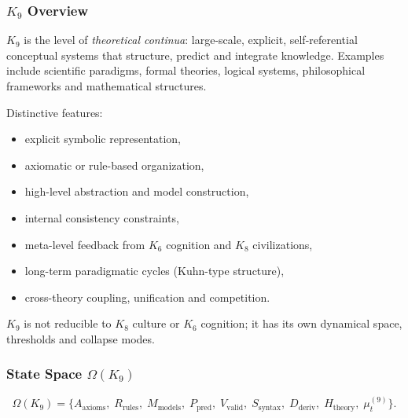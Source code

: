

\subsubsection{\texorpdfstring{$K_9$}{K_9} Overview}
\label{sec:k9-overview}

$K_9$ is the level of \emph{theoretical continua}: large-scale, explicit,
self-referential conceptual systems that structure, predict and integrate
knowledge. Examples include scientific paradigms, formal theories, logical
systems, philosophical frameworks and mathematical structures.

Distinctive features:
\begin{itemize}
    \item explicit symbolic representation,
    \item axiomatic or rule-based organization,
    \item high-level abstraction and model construction,
    \item internal consistency constraints,
    \item meta-level feedback from $K_6$ cognition and $K_8$ civilizations,
    \item long-term paradigmatic cycles (Kuhn-type structure),
    \item cross-theory coupling, unification and competition.
\end{itemize}

$K_9$ is not reducible to $K_8$ culture or $K_6$ cognition; it has its own
dynamical space, thresholds and collapse modes.

\subsubsection{State Space \texorpdfstring{$\Omega(K_9)$}{\Omega(K_9)}}

\[
\Omega(K_9)=
\{
A_{\mathrm{axioms}},\;
R_{\mathrm{rules}},\;
M_{\mathrm{models}},\;
P_{\mathrm{pred}},\;
V_{\mathrm{valid}},\;
S_{\mathrm{syntax}},\;
D_{\mathrm{deriv}},\;
H_{\mathrm{theory}},\;
\mu^{(9)}_t
\}.
\]

